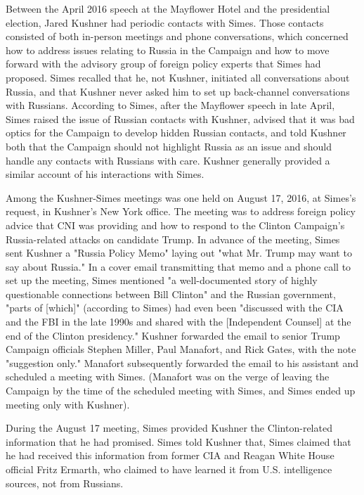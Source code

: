 Between the April 2016 speech at the Mayflower Hotel and the presidential election, Jared Kushner had periodic contacts with Simes.%
Those contacts consisted of both in-person meetings and phone conversations, which concerned how to address issues relating to Russia in the Campaign and how to move forward with the advisory group of foreign policy experts that Simes had proposed.%
Simes recalled that he, not Kushner, initiated all conversations about Russia, and that Kushner never asked him to set up back-channel conversations with Russians.%
According to Simes, after the Mayflower speech in late April, Simes raised the issue of Russian contacts with Kushner, advised that it was bad optics for the Campaign to develop hidden Russian contacts, and told Kushner both that the Campaign should not highlight Russia as an issue and should handle any contacts with Russians with care.%
Kushner generally provided a similar account of his interactions with Simes.%

Among the Kushner-Simes meetings was one held on August 17, 2016, at Simes's request, in Kushner's New York office.
The meeting was to address foreign policy advice that CNI was providing and how to respond to the Clinton Campaign's Russia-related attacks on candidate Trump.%
In advance of the meeting, Simes sent Kushner a "Russia Policy Memo" laying out "what Mr. Trump may want to say about Russia."%
In a cover email transmitting that memo and a phone call to set up the meeting, Simes mentioned "a well-documented story of highly questionable connections between Bill Clinton" and the Russian government, "parts of [which]" (according to Simes) had even been "discussed with the CIA and the FBI in the late 1990s and shared with the [Independent Counsel] at the end of the Clinton presidency."%
Kushner forwarded the email to senior Trump Campaign officials Stephen Miller, Paul Manafort, and Rick Gates, with the note "suggestion only."%
Manafort subsequently forwarded the email to his assistant and scheduled a meeting with Simes.%
(Manafort was on the verge of leaving the Campaign by the time of the scheduled meeting with Simes, and Simes ended up meeting only with Kushner).

During the August 17 meeting, Simes provided Kushner the Clinton-related information that he had promised.%
Simes told Kushner that,
Simes claimed that he had received this information from former CIA and Reagan White House official Fritz Ermarth, who claimed to have learned it from U.S. intelligence sources, not from Russians.%

